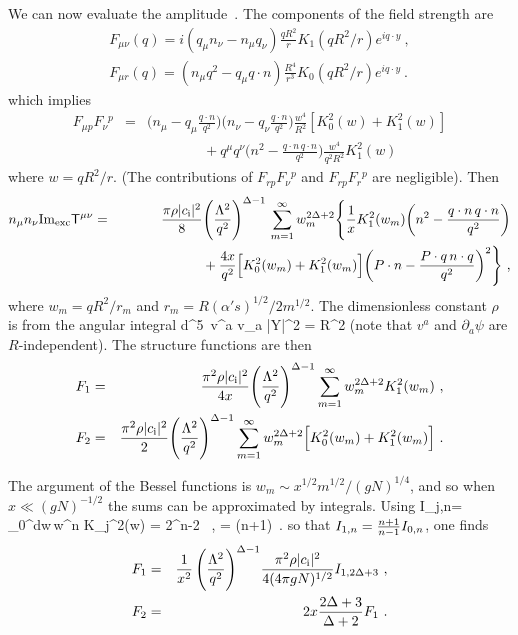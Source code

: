 We can now evaluate the amplitude~.  The components of the field
strength are
\begin{eqnarray}
F_{\mu\nu}(q) = i(q_\mu n_\nu - n_\mu q_\nu) \frac{q R^2}{r} K_1(qR^2/r)
e^{i q\cdot y}\ ,
\nonumber\\
F_{\mu r}(q) = (n_\mu q^2 - q_\mu q \cdot n) \frac{R^4}{r^3} K_0(qR^2/r) e^{i
q\cdot y}\ . \label{fmunu}
\end{eqnarray}
which implies
\begin{eqnarray}\label{ffmurho}
F_{\mu p} F_\nu{}^p &=& \biggl(n_\mu - q_\mu \frac{q\cdot
n}{q^2}\biggr)
\biggl(n_\nu - q_\nu \frac{q\cdot n}{q^2}\biggr)
\frac{w^4}{R^2} [K_0^2(w) + K_1^2(w) ]\nonumber\\
&&\qquad\qquad
+ {q^\mu q^\nu} \biggl(n^2 - \frac{q\cdot n \,
q\cdot n}{q^2} \biggr) \frac{w^4}{q^2 R^2} K_1^2(w)
\end{eqnarray}
where $w = q R^2/r$.
(The contributions of $F_{r p} F_\nu{}^p$ and $F_{r p} F_r{}^p$ are 
negligible).   
Then
\begin{eqnarray}
n_\mu n_\nu {\rm Im}_{\rm exc}{\sf T}^{\mu\nu} &=& \frac{\pi \rho |c_{\rm
i}|^2}{8}\Biggl(\frac{\Lambda^2}{q^2} \Biggr)^{\Delta - 1} \,
\sum_{m=1}^\infty w_m^{2\Delta+2}
\Biggl\{ \frac{1}{x} K^2_1(w_m) \biggl(n^2 - \frac{q \cdot n\,q\cdot 
n}{q^2} \biggr)
\nonumber\\
&&{\qquad\qquad\qquad}
+ \frac{4 x}{q^2}\Bigl[K^2_0(w_m) + K^2_1(w_m)\Bigr] \biggl(P \cdot n 
- \frac{P \cdot
q\,n\cdot q }{ q^2}\biggr)^2 \Biggr\}\ ,
\label{Ramp2}
\end{eqnarray}
where $w_m = qR^2/r_m$ and $r_m = {R (\alpha' s )^{1/2}}/{2  m^{1/2}}$.
The dimensionless constant
$\rho$ is from the angular integral
\int d^5\Omega {}\, v^a v_a |Y|^2 = \rho R^2
\ee
(note that $v^a$ and
$\partial_a \psi$ are $R$-independent).  The structure functions are then
\begin{eqnarray}
F_1  &=& \frac{\pi^2 \rho |c_{\rm i}|^2}{  4x } \Biggl(\frac{\Lambda^2}{q^2}
\Biggr)^{\Delta - 1}
\sum_{m=1}^\infty w_m^{2\Delta+2}
  K^2_1(w_m)\ ,\nonumber\\
F_2  &=& \frac{\pi^2\rho |c_{\rm i}|^2}{2} \Biggl (\frac{\Lambda^2}{q^2}
\Biggr)^{\Delta - 1}
\sum_{m=1}^\infty w_m^{2\Delta+2}
\Bigl[K^2_0(w_m) + K^2_1(w_m)\Bigr]
\ . \label{w12}
\end{eqnarray}

The argument of the Bessel functions is $w_m \sim x^{1/2} m^{1/2} /(gN)^{1/4}$,
and so when $x \ll (gN)^{-1/2}$ the sums can be approximated by integrals.  Using
I_{j,n}= \int_0^\infty dw\,w^n K_j^2(w) = 2^{n-2}
\ ,\quad
\nu = (n+1)\ .
\ee
so that $I_{1,n}={n+1\over n-1}I_{0,n}$, one finds
\begin{eqnarray}
F_1  &=&  \frac{1}{x^2}\,
\Biggl(\frac{\Lambda^2}{q^2}
\Biggr)^{\Delta - 1} \frac{\pi^2\rho |c_{\rm i}|^2}{  4 (4\pi gN)^{1/2}}
I_{1,2\Delta+3}\ ,\nonumber\\
F_2  &=& 2x {2\Delta+3\over \Delta+2}F_1 \ .
\label{Rw12}
\end{eqnarray}

